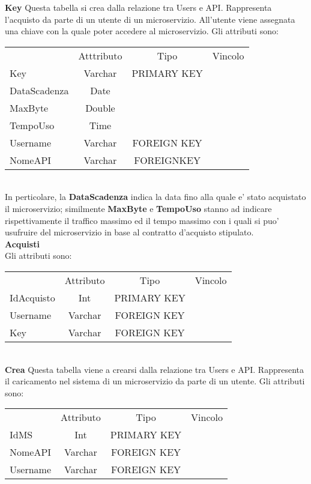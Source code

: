 {{		\textbf{Key}
			Questa tabella si crea dalla relazione tra Users e API. Rappresenta l'acquisto da parte di un utente di un microservizio. All'utente viene assegnata una chiave con la quale poter accedere al microservizio. Gli attributi sono:
			\begin{center}
			\begin{tabular}{lccc}
				&Atttributo&Tipo&Vincolo\\
				Key&Varchar&PRIMARY KEY\\
				DataScadenza&Date& \\
				MaxByte&Double& \\
				TempoUso&Time& \\
				Username&Varchar&FOREIGN KEY\\
				NomeAPI&Varchar&FOREIGNKEY\\			
			\end{tabular}
			\end{center}\\
			In perticolare, la \textbf{DataScadenza} indica la data fino alla quale e' stato acquistato il microservizio; similmente \textbf{MaxByte} e \textbf{TempoUso} stanno ad indicare rispettivamente il traffico massimo ed il tempo massimo con i quali si puo' usufruire del microservizio in base al contratto d'acquisto stipulato.\\
			
		\textbf{Acquisti}\\
		Gli attributi sono: \\
		\begin{center}
		\begin{tabular}{lccc}
			&Attributo&Tipo&Vincolo\\
			IdAcquisto&Int&PRIMARY KEY\\
			Username&Varchar&FOREIGN KEY\\
			Key&Varchar&FOREIGN KEY\\
		\end{tabular}
		\end{center}\\
			
		\textbf{Crea}
			Questa tabella viene a crearsi dalla relazione tra Users e API. Rappresenta il caricamento nel sistema di un microservizio da parte di un utente. Gli attributi sono:
			\begin{center}
			\begin{tabular}{lccc}
				&Attributo&Tipo&Vincolo\\
				IdMS&Int&PRIMARY KEY\\
				NomeAPI&Varchar&FOREIGN KEY\\
				Username&Varchar&FOREIGN KEY\\			
			\end{tabular}
			\end{center}
			
		}
	
}